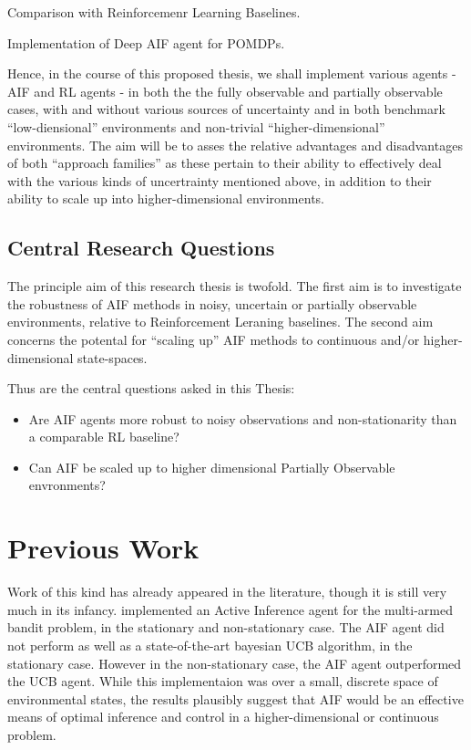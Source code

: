 \documentclass[12pt, twoside]{report}
\begin{document}
Comparison with Reinforcemenr Learning Baselines.

Implementation of Deep AIF agent for POMDPs. 

Hence, in the course of this proposed thesis, we shall implement various agents - AIF and RL agents - in both the the fully observable and partially observable cases, with and without various sources of uncertainty and in both benchmark ``low-diensional'' environments and  non-trivial ``higher-dimensional'' environments. The aim will be to asses the relative advantages and disadvantages of both ``approach families'' as these pertain to their ability to effectively deal with the various kinds of uncertrainty mentioned above, in addition to their ability to scale up into higher-dimensional environments.     


\subsection{Central Research Questions}
The principle aim of this research thesis is twofold. The first aim is to investigate the robustness of AIF methods in noisy, uncertain or partially observable environments, relative to Reinforcement Leraning baselines. The second aim concerns the potental for ``scaling up'' AIF methods to continuous and/or higher-dimensional state-spaces. 

Thus are the central questions asked in this Thesis:

\begin{itemize}
\item Are AIF agents more robust to noisy observations and non-stationarity than a comparable RL baseline?
\item Can AIF be scaled up to higher dimensional Partially Observable envronments? 
\end{itemize} 



\section{Previous Work}
Work of this kind has already appeared in the literature, though it is still very much in its infancy. \textcite{Markovi-2021} implemented an Active Inference agent for the multi-armed bandit problem, in the stationary and non-stationary case. The AIF agent did not perform as well as a state-of-the-art bayesian UCB algorithm, in the stationary case. However in the non-stationary case, the AIF agent outperformed the UCB agent. While this implementaion was over a small, discrete space of environmental states, the results plausibly suggest that AIF would be an effective means of optimal inference and control in a higher-dimensional or continuous problem.  
\end{document}

